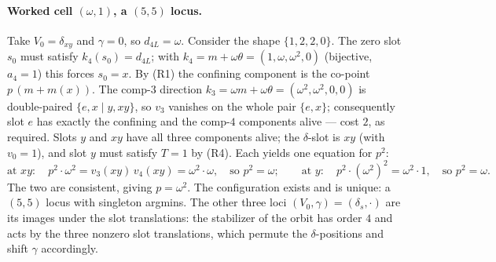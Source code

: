 \documentclass[11pt]{article}
\theoremstyle{plain}
\theoremstyle{definition}
\theoremstyle{remark}
\begin{document}
\paragraph{Worked cell $(\omega,1)$, a $(5,5)$ locus.}
Take $V_0=\delta_{xy}$ and $\gamma=0$, so $d_{4L}=\omega$. Consider the shape
$\{1,2,2,0\}$. The zero slot $s_0$ must satisfy $k_4(s_0)=d_{4L}$; with
$k_4=m+\omega\theta=(1,\omega,\omega^2,0)$ (bijective, $a_4=1$) this forces $s_0=x$. By (R1)
the confining component is the co-point $p\,(m+m(x))$. The comp-$3$ direction
$k_3=\omega m+\omega\theta=(\omega^2,\omega^2,0,0)$ is double-paired $\{e,x\mid y,xy\}$, so
$v_3$ vanishes on the whole pair $\{e,x\}$; consequently slot $e$ has exactly the confining
and the comp-$4$ components alive --- cost $2$, as required. Slots $y$ and $xy$ have all three
components alive; the $\delta$-slot is $xy$ (with $v_0=1$), and slot $y$ must satisfy $T=1$ by
(R4). Each yields one equation for $p^2$:
\[
  \text{at }xy:\quad p^2\cdot\omega^2=v_3(xy)\,v_4(xy)=\omega^2\cdot\omega,\quad\text{so }p^2=\omega;
  \qquad
  \text{at }y:\quad p^2\cdot(\omega^2)^2=\omega^2\cdot 1,\quad\text{so }p^2=\omega.
\]
The two are consistent, giving $p=\omega^2$. The configuration exists and is unique: a
$(5,5)$ locus with singleton argmins. The other three loci $(V_0,\gamma)=(\delta_s,\cdot)$ are
its images under the slot translations: the stabilizer of the orbit has order $4$ and acts by
the three nonzero slot translations, which permute the $\delta$-positions and shift $\gamma$
accordingly.
\end{document}
